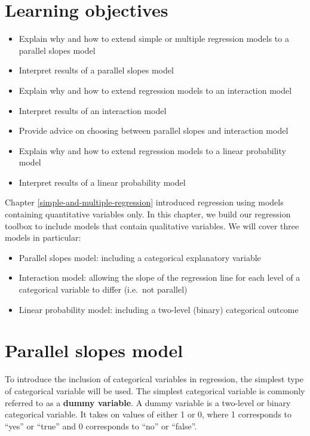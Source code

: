 \documentclass[
]{book}
\providecommand{\tightlist}{%
  \setlength{\itemsep}{0pt}\setlength{\parskip}{0pt}}
\newenvironment{learncheck}%
{%
  \par\vspace{\baselineskip}\noindent 
  \color{Exercise}\begin{itshape}%
  \par\vspace{\baselineskip}\noindent\ignorespaces 
}%
{%
  \end{itshape}\ignorespacesafterend 
}
\begin{document}
\hypertarget{lo7}{%
\section{Learning objectives}\label{lo7}}

\begin{learncheck}
\begin{itemize}
\tightlist
\item
  Explain why and how to extend simple or multiple regression models to
  a parallel slopes model
\item
  Interpret results of a parallel slopes model
\item
  Explain why and how to extend regression models to an interaction
  model
\item
  Interpret results of an interaction model
\item
  Provide advice on choosing between parallel slopes and interaction
  model
\item
  Explain why and how to extend regression models to a linear
  probability model
\item
  Interpret results of a linear probability model
\end{itemize}
\end{learncheck}

Chapter \ref{simple-and-multiple-regression} introduced regression using models containing quantitative variables only. In this chapter, we build our regression toolbox to include models that contain qualitative variables. We will cover three models in particular:

\begin{itemize}
\tightlist
\item
  Parallel slopes model: including a categorical explanatory variable
\item
  Interaction model: allowing the slope of the regression line for each level of a categorical variable to differ (i.e.~not parallel)
\item
  Linear probability model: including a two-level (binary) categorical outcome
\end{itemize}

\hypertarget{parallel-slopes-model}{%
\section{Parallel slopes model}\label{parallel-slopes-model}}

To introduce the inclusion of categorical variables in regression, the simplest type of categorical variable will be used. The simplest categorical variable is commonly referred to as a \textbf{dummy variable}. A dummy variable is a two-level or binary categorical variable. It takes on values of either 1 or 0, where 1 corresponds to ``yes'' or ``true'' and 0 corresponds to ``no'' or ``false''.
\end{document}
